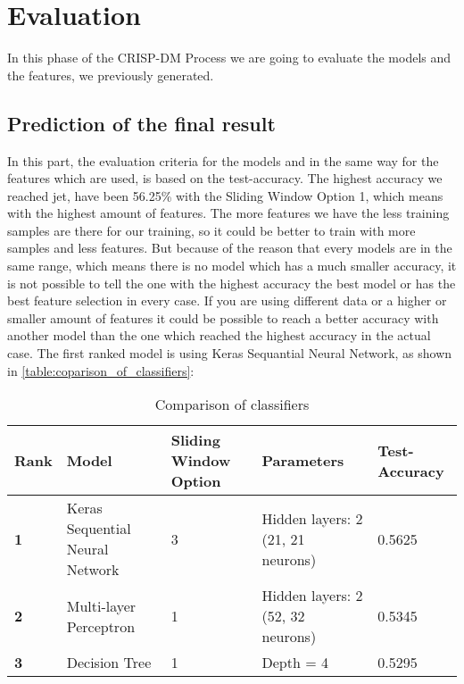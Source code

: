 
\chapter{Evaluation}
In this phase of the CRISP-DM Process we are going to evaluate the models and the features, we previously generated.\newline

\section{Prediction of the final result}
In this part, the evaluation criteria for the models and in the same way for the features which are used, is based on the test-accuracy. The highest accuracy we reached jet, have been 56.25\% with the Sliding Window Option 1, which means with the highest amount of features. The more features we have the less training samples are there for our training, so it could be better to train with more samples and less features. But because of the reason that every models are in the same range, which means there is no model which has a much smaller accuracy, it is not possible to tell the one with the highest accuracy the best model or has the best feature selection in every case. If you are using different data or a higher or smaller amount of features it could be possible to reach a better accuracy with another model than the one which reached the highest accuracy in the actual case. The first ranked model is using Keras Sequantial Neural Network, as shown in \autoref{table:coparison_of_classifiers}:

\begin{table}[H]
\centering
\begin{tabular}{|p{2.5cm}|p{2.5cm}|p{2.5cm}|p{2.5cm}|p{2.5cm}|}
\hline

\textbf{Rank} & \textbf{Model} & \textbf{Sliding Window Option} & \textbf{Parameters} & \textbf{Test-Accuracy} \\ \hline
\textbf{1} & Keras Sequential Neural Network & 3 & Hidden layers: 2 (21, 21 neurons) & 0.5625 \\ \hline
\textbf{2} & Multi-layer Perceptron & 1 & Hidden layers: 2 (52, 32 neurons) & 0.5345 \\ \hline
\textbf{3} & Decision Tree & 1 & Depth = 4 & 0.5295 \\ \hline

\end{tabular}
\caption{Comparison of classifiers}
\label{table:coparison_of_classifiers}
\end{table}

